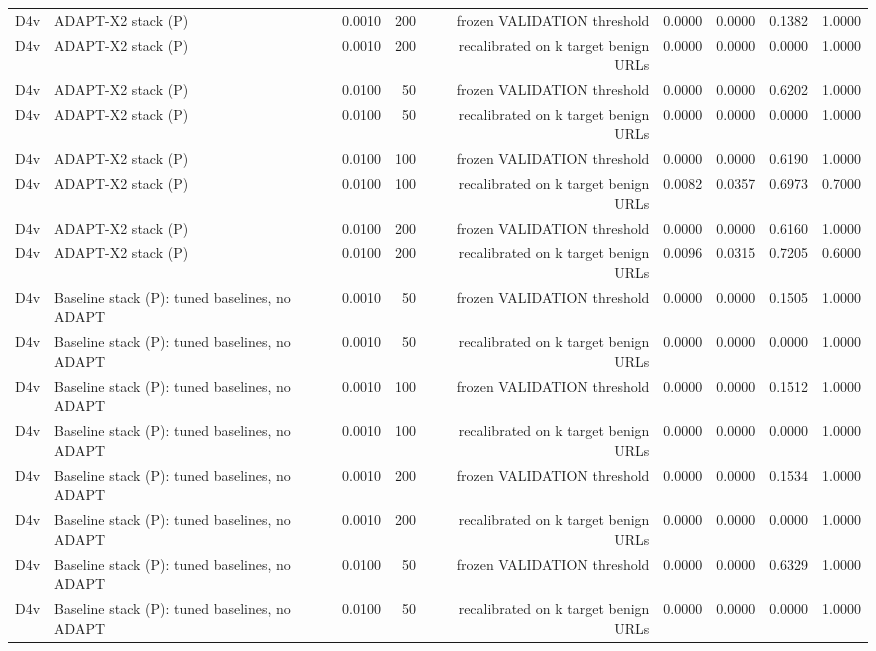 \begin{table}[t]
\begin{tabular}{llrrrrrrr}
D4v & ADAPT-X2 stack (P) & 0.0010 & 200 & frozen VALIDATION threshold & 0.0000 & 0.0000 & 0.1382 & 1.0000 \\
D4v & ADAPT-X2 stack (P) & 0.0010 & 200 & recalibrated on k target benign URLs & 0.0000 & 0.0000 & 0.0000 & 1.0000 \\
D4v & ADAPT-X2 stack (P) & 0.0100 & 50 & frozen VALIDATION threshold & 0.0000 & 0.0000 & 0.6202 & 1.0000 \\
D4v & ADAPT-X2 stack (P) & 0.0100 & 50 & recalibrated on k target benign URLs & 0.0000 & 0.0000 & 0.0000 & 1.0000 \\
D4v & ADAPT-X2 stack (P) & 0.0100 & 100 & frozen VALIDATION threshold & 0.0000 & 0.0000 & 0.6190 & 1.0000 \\
D4v & ADAPT-X2 stack (P) & 0.0100 & 100 & recalibrated on k target benign URLs & 0.0082 & 0.0357 & 0.6973 & 0.7000 \\
D4v & ADAPT-X2 stack (P) & 0.0100 & 200 & frozen VALIDATION threshold & 0.0000 & 0.0000 & 0.6160 & 1.0000 \\
D4v & ADAPT-X2 stack (P) & 0.0100 & 200 & recalibrated on k target benign URLs & 0.0096 & 0.0315 & 0.7205 & 0.6000 \\
D4v & Baseline stack (P): tuned baselines, no ADAPT & 0.0010 & 50 & frozen VALIDATION threshold & 0.0000 & 0.0000 & 0.1505 & 1.0000 \\
D4v & Baseline stack (P): tuned baselines, no ADAPT & 0.0010 & 50 & recalibrated on k target benign URLs & 0.0000 & 0.0000 & 0.0000 & 1.0000 \\
D4v & Baseline stack (P): tuned baselines, no ADAPT & 0.0010 & 100 & frozen VALIDATION threshold & 0.0000 & 0.0000 & 0.1512 & 1.0000 \\
D4v & Baseline stack (P): tuned baselines, no ADAPT & 0.0010 & 100 & recalibrated on k target benign URLs & 0.0000 & 0.0000 & 0.0000 & 1.0000 \\
D4v & Baseline stack (P): tuned baselines, no ADAPT & 0.0010 & 200 & frozen VALIDATION threshold & 0.0000 & 0.0000 & 0.1534 & 1.0000 \\
D4v & Baseline stack (P): tuned baselines, no ADAPT & 0.0010 & 200 & recalibrated on k target benign URLs & 0.0000 & 0.0000 & 0.0000 & 1.0000 \\
D4v & Baseline stack (P): tuned baselines, no ADAPT & 0.0100 & 50 & frozen VALIDATION threshold & 0.0000 & 0.0000 & 0.6329 & 1.0000 \\
D4v & Baseline stack (P): tuned baselines, no ADAPT & 0.0100 & 50 & recalibrated on k target benign URLs & 0.0000 & 0.0000 & 0.0000 & 1.0000 \\

\end{tabular}
\end{table}

